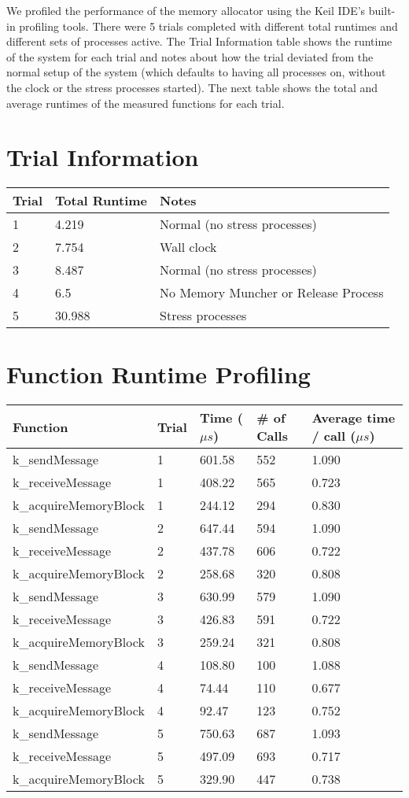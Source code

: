 \documentclass[12pt]{report}
\begin{document}
We profiled the performance of the memory allocator using the Keil IDE's built-
in profiling tools.  There were 5 trials completed with different total runtimes
and different sets of  processes active. The Trial Information table shows the
runtime  of the system for each trial and notes about how the trial deviated
from the normal  setup of the system (which defaults to having all processes on,
without the clock  or the stress processes started). The next table shows the
total and average runtimes  of the measured functions for each trial.

\section{Trial Information}

\begin{tabular}{l | l | l}
    Trial&Total Runtime&Notes \\
    \hline
    1&4.219&Normal (no stress processes) \\
    2&7.754&Wall clock \\
    3&8.487&Normal (no stress processes)\\
    4&6.5&No Memory Muncher or Release Process \\
    5&30.988&Stress processes \\
\end{tabular}

\section{Function Runtime Profiling}
\begin{tabular}{l | l | l | l | l}
    Function & Trial & Time ($\mu s$) & \# of Calls & Average time / call ($\mu s$) \\
    \hline
    k\_sendMessage&1&601.58&552&1.090 \\
    k\_receiveMessage&1&408.22&565&0.723 \\
    k\_acquireMemoryBlock&1&244.12&294&0.830 \\
    k\_sendMessage&2&647.44&594&1.090 \\
    k\_receiveMessage&2&437.78&606&0.722 \\
    k\_acquireMemoryBlock&2&258.68&320&0.808 \\
    k\_sendMessage&3&630.99&579&1.090 \\
    k\_receiveMessage&3&426.83&591&0.722 \\
    k\_acquireMemoryBlock&3&259.24&321&0.808 \\
    k\_sendMessage&4&108.80&100&1.088 \\
    k\_receiveMessage&4&74.44&110&0.677 \\
    k\_acquireMemoryBlock&4&92.47&123&0.752 \\
    k\_sendMessage&5&750.63&687&1.093 \\
    k\_receiveMessage&5&497.09&693&0.717 \\
    k\_acquireMemoryBlock&5&329.90&447&0.738 \\
\end{tabular}
\end{document}
